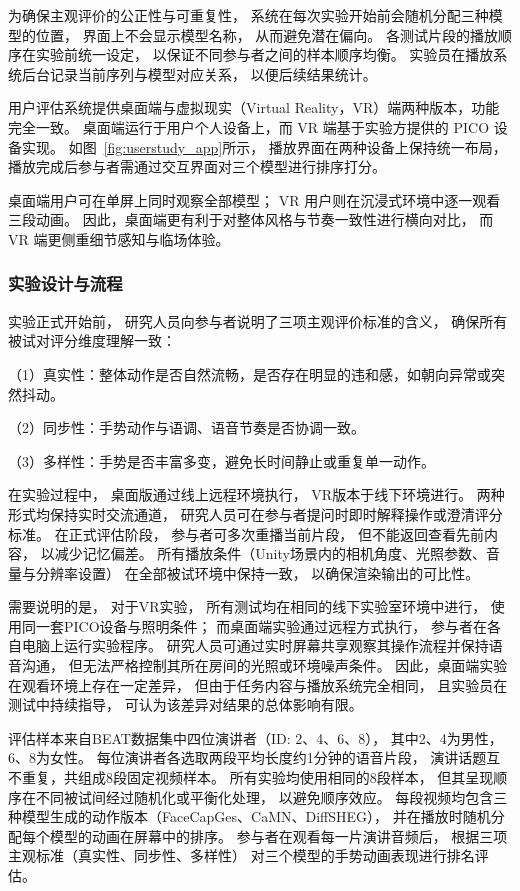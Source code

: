 为确保主观评价的公正性与可重复性，
系统在每次实验开始前会随机分配三种模型的位置，
界面上不会显示模型名称，
从而避免潜在偏向。
各测试片段的播放顺序在实验前统一设定，
以保证不同参与者之间的样本顺序均衡。
实验员在播放系统后台记录当前序列与模型对应关系，
以便后续结果统计。

用户评估系统提供桌面端与虚拟现实（Virtual Reality，VR）端两种版本，功能完全一致。
桌面端运行于用户个人设备上，而 VR 端基于实验方提供的 PICO 设备\cite{pico4}实现。
如图~\ref{fig:userstudy_app}所示，
播放界面在两种设备上保持统一布局，
播放完成后参与者需通过交互界面对三个模型进行排序打分。

桌面端用户可在单屏上同时观察全部模型；
VR 用户则在沉浸式环境中逐一观看三段动画。
因此，桌面端更有利于对整体风格与节奏一致性进行横向对比，
而 VR 端更侧重细节感知与临场体验。

\subsubsection{实验设计与流程}
实验正式开始前，
研究人员向参与者说明了三项主观评价标准的含义，
确保所有被试对评分维度理解一致：

（1）真实性：整体动作是否自然流畅，是否存在明显的违和感，如朝向异常或突然抖动。

（2）同步性：手势动作与语调、语音节奏是否协调一致。

（3）多样性：手势是否丰富多变，避免长时间静止或重复单一动作。

在实验过程中，
桌面版通过线上远程环境执行，
VR版本于线下环境进行。
两种形式均保持实时交流通道，
研究人员可在参与者提问时即时解释操作或澄清评分标准。
在正式评估阶段，
参与者可多次重播当前片段，
但不能返回查看先前内容，
以减少记忆偏差。
所有播放条件（Unity场景内的相机角度、光照参数、音量与分辨率设置）
在全部被试环境中保持一致，
以确保渲染输出的可比性。

需要说明的是，
对于VR实验，
所有测试均在相同的线下实验室环境中进行，
使用同一套PICO设备与照明条件；
而桌面端实验通过远程方式执行，
参与者在各自电脑上运行实验程序。
研究人员可通过实时屏幕共享观察其操作流程并保持语音沟通，
但无法严格控制其所在房间的光照或环境噪声条件。
因此，桌面端实验在观看环境上存在一定差异，
但由于任务内容与播放系统完全相同，
且实验员在测试中持续指导，
可认为该差异对结果的总体影响有限。

评估样本来自BEAT数据集中四位演讲者（ID: 2、4、6、8），
其中2、4为男性，6、8为女性。
每位演讲者各选取两段平均长度约1分钟的语音片段，
演讲话题互不重复，共组成8段固定视频样本。
所有实验均使用相同的8段样本，
但其呈现顺序在不同被试间经过随机化或平衡化处理，
以避免顺序效应。
每段视频均包含三种模型生成的动作版本（FaceCapGes、CaMN、DiffSHEG），
并在播放时随机分配每个模型的动画在屏幕中的排序。
参与者在观看每一片演讲音频后，
根据三项主观标准（真实性、同步性、多样性）
对三个模型的手势动画表现进行排名评估。

